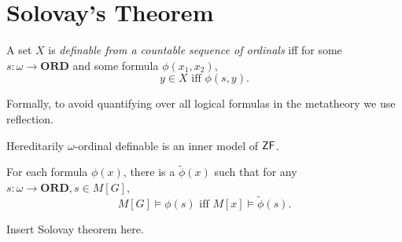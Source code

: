 \section{Solovay's Theorem}

\begin{definition}
    A set \(X\) is \emph{definable from a countable sequence of ordinals} iff
    for some \(s:\omega\to\mathbf{ORD}\) and some formula \(\phi(x_1,x_2)\),
    \[ y\in X \text{ iff } \phi(s,y). \]
\end{definition}
\begin{remark}
    Formally, to avoid quantifying over all logical formulas in the metatheory we use reflection.
\end{remark}

\begin{proposition}
    Hereditarily \(\omega\)-ordinal definable is an inner model of \(\mbox{\normalfont \textsf{ZF}}\).
\end{proposition}

\begin{lemma}
    For each formula \(\phi(x)\), there is a \(\tilde{\phi}(x)\) such that
    for any \(s:\omega\to\mathbf{ORD}, s\in M[G]\),
    \[ M[G]\models \phi(s) \text{ iff } M[x] \models \tilde{\phi}(s). \]
\end{lemma}

\begin{theorem}
    Insert Solovay theorem here.
\end{theorem}
